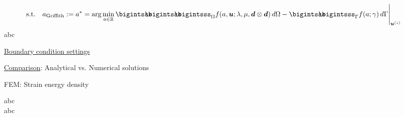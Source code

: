 \documentclass[25pt, a0paper,
portrait,
margin=2mm, 
innermargin=2mm, 
blockverticalspace=7mm, %
colspace=2mm, %
subcolspace=0mm]{tikzposter}
\makeatletter
\newcommand*{\inputfig}[3][htb]{{
    \def\fps@figure{#1}
    \def\DIR{#2}
    \def\LABEL{#3}
    \graphicspath{{\DIR/}}
    
}}
\newcommand{\WAsigma}{\prescript{\prescript{\mathcal{W}}{}{\!\!\!\mathcal{A}}}{}{\!\sigma}}
\makeatother
\begin{document}
{\begin{minipage}{0.43\textwidth}
\begin{mdframed}
\begin{align*}
				\text{s.t.}\quad
				 & a_{\text{Griffith}} := a^{*} = \arg\min_{a\in\mathbb{R}}{\bigintsss\!\!\!\!\!\!\bigintsss\!\!\!\!\!\!\bigintsss_{\Omega} f(a,\bm{u};\lambda,\mu,\bm{d}\otimes\bm{d}) \, d\Omega - \bigintsss\!\!\!\!\!\!\bigintsss_{\Gamma} f(a;\gamma) \, d\Gamma}\Bigg|_{\bm{u}^{(s)}}
			\end{align*}
			abc
		\end{mdframed}
	\end{minipage}
	\hfill
	\begin{minipage}{0.54\textwidth}
		\begin{minipage}{0.7\textwidth}
			\begin{mdframed}
				\underline{Boundary condition settings}
				\begin{center}
					\inputfig{floats/structuraltwofields}{structuraltwofields}
				\end{center}
			\end{mdframed}
			\begin{mdframed}
				\begin{center}
					\inputfig{floats/routine_woTV_numa_one}{routine_woTV_numa_one}
				\end{center}
				\underline{Comparison}: Analytical vs. Numerical solutions
				\begin{center}
					\inputfig{floats/comparison_ana_numa}{comparison_ana_numa}
				\end{center}
			\end{mdframed}
		\end{minipage}
		\hfill 
		\begin{minipage}{0.3\textwidth}
			\begin{mdframed}
				FEM: Strain energy density
				\vspace{0.1cm}
				\inputfig{floats/griffith_flowchart_circle_formula}{griffith_flowchart_circle_formula}
				abc\\
				abc
			\end{mdframed}

\end{minipage}
\end{minipage}}
\end{document}
